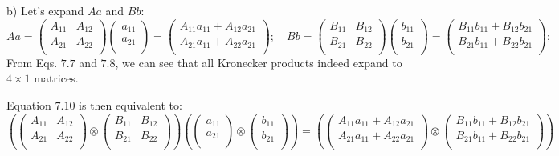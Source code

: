 \documentclass[solutions.tex]{subfiles}
\begin{document}
b) Let's expand $Aa$ and $Bb$:
\[
	Aa = \begin{pmatrix}
		A_{11} & A_{12} \\
		A_{21} & A_{22} \\
	\end{pmatrix}\begin{pmatrix}
		a_{11} \\
		a_{21} \\
	\end{pmatrix} = \begin{pmatrix}
		A_{11}a_{11}+A_{12}a_{21} \\
		A_{21}a_{11}+A_{22}a_{21} \\
	\end{pmatrix};\quad
	Bb = \begin{pmatrix}
		B_{11} & B_{12} \\
		B_{21} & B_{22} \\
	\end{pmatrix}\begin{pmatrix}
		b_{11} \\
		b_{21} \\
	\end{pmatrix} = \begin{pmatrix}
		B_{11}b_{11}+B_{12}b_{21} \\
		B_{21}b_{11}+B_{22}b_{21} \\
	\end{pmatrix};
\]
From Eqs. $7.7$ and $7.8$, we can see that all Kronecker
products indeed expand to $4\times1$ matrices.

Equation $7.10$ is then equivalent to:
\[
	\left(\begin{pmatrix}
		A_{11} & A_{12} \\
		A_{21} & A_{22} \\
	\end{pmatrix}\otimes\begin{pmatrix}
		B_{11} & B_{12} \\
		B_{21} & B_{22} \\
	\end{pmatrix}\right)\left(
	\begin{pmatrix}
		a_{11} \\
		a_{21} \\
	\end{pmatrix}\otimes\begin{pmatrix}
		b_{11} \\
		b_{21} \\
	\end{pmatrix}\right) = \left(
		\begin{pmatrix}
			A_{11}a_{11}+A_{12}a_{21} \\
			A_{21}a_{11}+A_{22}a_{21} \\
		\end{pmatrix}\otimes\begin{pmatrix}
			B_{11}b_{11}+B_{12}b_{21} \\
			B_{21}b_{11}+B_{22}b_{21} \\
		\end{pmatrix}
	\right)
\]
\end{document}
